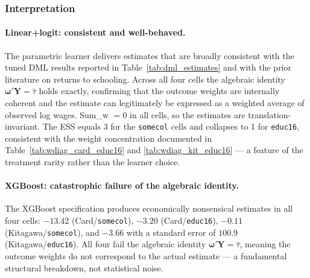 \documentclass[12pt]{article}
\begin{document}
\subsubsection*{Interpretation}

\paragraph{Linear+logit: consistent and well-behaved.}
The parametric learner delivers estimates that are broadly consistent
with the tuned DML results reported in Table~\ref{tab:dml_estimates}
and with the prior literature on returns to schooling.
Across all four cells the algebraic identity
$\boldsymbol{\omega}'\mathbf{Y} = \hat\tau$ holds exactly, confirming
that the outcome weights are internally coherent and the estimate can
legitimately be expressed as a weighted average of observed log wages.
Sum\_w $= 0$ in all cells, so the estimates are translation-invariant.
The ESS equals 3 for the \texttt{somecol} cells and collapses to 1 for
\texttt{educ16}, consistent with the weight concentration documented in
Table~\ref{tab:wdiag_card_educ16} and \ref{tab:wdiag_kit_educ16} --- a
feature of the treatment rarity rather than the learner choice.

\paragraph{XGBoost: catastrophic failure of the algebraic identity.}
The XGBoost specification produces economically nonsensical estimates in
all four cells: $-13.42$ (Card/\texttt{somecol}), $-3.20$
(Card/\texttt{educ16}), $-0.11$ (Kitagawa/\texttt{somecol}), and
$-3.66$ with a standard error of $100.9$
(Kitagawa/\texttt{educ16}). All four fail the algebraic identity
$\boldsymbol{\omega}'\mathbf{Y} = \hat\tau$, meaning the outcome weights
do not correspond to the actual estimate --- a fundamental structural
breakdown, not statistical noise.
\end{document}
